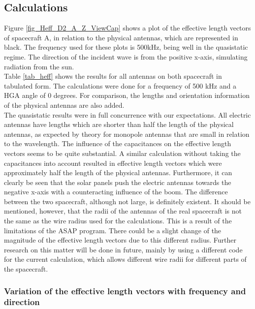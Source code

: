 \documentclass[galley,ras]{agu2001}
\begin{document}
\begin{article}
\subsection{Calculations}
Figure \ref{fig_Heff_D2_A_Z_ViewCap} shows a plot of the effective length vectors of spacecraft A, in relation to the physical antennas, which are represented in black. The frequency used for these plots is 500kHz, being well in the quasistatic regime. The direction of the incident wave is from the positive x-axis, simulating radiation from the sun.\\

Table \ref{tab_heff} shows the results for all antennas on both spacecraft in tabulated form. The calculations were done for a frequency of 500 kHz and a HGA angle of 0 degrees. For comparison, the lengths and orientation information of the physical antennas are also added.\\

The quasistatic results were in full concurrence with our expectations. All electric antennas have lengths which are shorter than half the length of the physical antennas, as expected by theory for monopole antennas that are small in relation to the wavelength. The influence of the capacitances on the effective length vectors seems to be quite substantial. A similar calculation without taking the capacitances into account resulted in effective length vectors which were approximately half the length of the physical antennas. Furthermore, it can clearly be seen that the solar panels push the electric antennas towards the negative x-axis with a counteracting influence of the boom. The difference between the two spacecraft, although not large, is definitely existent. It should be mentioned, however, that the radii of the antennas of the real spacecraft is not the same as the wire radius used for the calculations. This is a result of the limitations of the ASAP program. There could be a slight change of the magnitude of the effective length vectors due to this different radius. Further research on this matter will be done in future, mainly by using a different code for the current calculation, which allows different wire radii for different parts of the spacecraft.\\

\subsubsection{Variation of the effective length vectors with frequency and direction}


\end{article}
\end{document}
